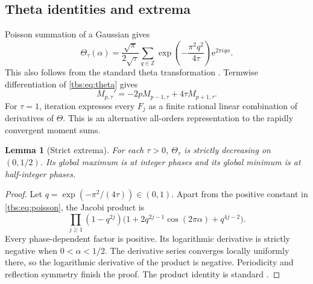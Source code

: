 \documentclass[11pt,a4paper]{article}
\numberwithin{equation}{section}
\newtheorem{lemma}[theorem]{Lemma}
\theoremstyle{definition}
\newcommand{\Z}{\mathbb Z}
\newcommand{\ee}{\mathrm e}
\begin{document}
\subsection{Theta identities and extrema}
Poisson summation of a Gaussian gives
\begin{equation}\label{tbs:eq:poisson}
 \Theta_\tau(\alpha)=\frac{\sqrt\pi}{2\sqrt\tau}
 \sum_{q\in\Z}\exp\!\left(-\frac{\pi^2q^2}{4\tau}\right)
                         \ee^{2\pi i q\alpha}.
\end{equation}
This also follows from the standard theta transformation
\cite{dlmftransform}. Termwise differentiation of \eqref{tbs:eq:theta} gives
\begin{equation}\label{tbs:eq:momentrec}
 M_{p,\tau}'=-2pM_{p-1,\tau}+4\tau M_{p+1,\tau}.
\end{equation}
For $\tau=1$, iteration expresses every $F_j$ as a finite rational
linear combination of derivatives of $\Theta$. This is an alternative
all-orders representation to the rapidly convergent moment sums.

\begin{lemma}[Strict extrema]\label{tbs:lem:theta-extrema}
For each $\tau>0$, $\Theta_\tau$ is strictly decreasing on $(0,1/2)$.
Its global maximum is at integer phases and its global minimum is at
half-integer phases.
\end{lemma}
\begin{proof}
Let $q=\exp(-\pi^2/(4\tau))\in(0,1)$. Apart from the positive constant
in \eqref{tbs:eq:poisson}, the Jacobi product is
\[
 \prod_{j\ge1}(1-q^{2j})
 \bigl(1+2q^{2j-1}\cos(2\pi\alpha)+q^{4j-2}\bigr).
\]
Every phase-dependent factor is positive. Its logarithmic derivative is
strictly negative when $0<\alpha<1/2$. The derivative series converges
locally uniformly there, so the logarithmic derivative of the product
is negative. Periodicity and reflection symmetry finish the proof.
The product identity is standard \cite{dlmftheta}.
\end{proof}
\end{document}
